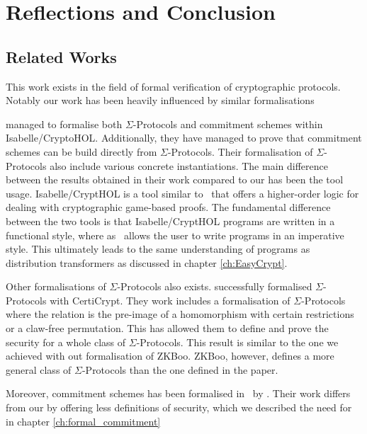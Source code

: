 \chapter{Reflections and Conclusion}
\label{sec:reflection_conclusion}

\section{Related Works}
\label{sec:related_works}
This work exists in the field of formal verification of cryptographic protocols.
Notably our work has been heavily influenced by similar formalisations
\cite{cryptoeprint:2019:1185,DBLP:journals/corr/MetereD17,certicrypt_sigma,zkcrypt,Yao}

\citet{cryptoeprint:2019:1185} managed to formalise both $\Sigma$-Protocols and
commitment schemes within Isabelle/CryptoHOL. Additionally, they have managed to
prove that commitment schemes can be build directly from $\Sigma$-Protocols.
Their formalisation of $\Sigma$-Protocols also include various concrete
instantiations.
The main difference between the results obtained in their work compared to our
has been the tool usage. Isabelle/CryptHOL is a tool similar to \easycrypt\ that
offers a higher-order logic for dealing with cryptographic game-based proofs.
The fundamental difference between the two tools is that Isabelle/CryptHOL
programs are written in a functional style, where as \easycrypt\ allows the user
to write programs in an imperative style. This ultimately leads to the same
understanding of programs as distribution transformers as discussed in chapter \ref{ch:EasyCrypt}.

Other formalisations of $\Sigma$-Protocols also exists. \citet{certicrypt_sigma}
successfully formalised $\Sigma$-Protocols with CertiCrypt. They work includes a
formalisation of $\Sigma$-Protocols where the relation is the pre-image of a
homomorphism with certain restrictions or a claw-free permutation. This has
allowed them to define and prove the security for a whole class of
$\Sigma$-Protocols. This result is similar to the one we achieved with out
formalisation of ZKBoo. ZKBoo, however, defines a more general class of
$\Sigma$-Protocols than the one defined in the paper.

Moreover, commitment schemes has been formalised in \easycrypt\ by
\citet{DBLP:journals/corr/MetereD17}. Their work differs from our by offering
less definitions of security, which we described the need for in chapter \ref{ch:formal_commitment}

